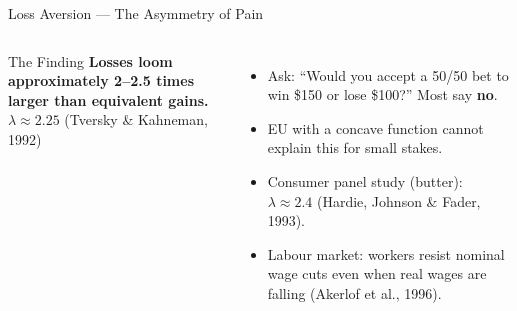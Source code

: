 \documentclass[aspectratio=169]{beamer}
\begin{document}
\begin{frame}{Loss Aversion --- The Asymmetry of Pain}
\begin{columns}
\begin{block}{The Finding}
\textbf{Losses loom approximately 2--2.5 times larger than equivalent gains.} \\[0.5em]
$\lambda \approx 2.25$ \quad (Tversky \& Kahneman, 1992)
\end{block}
\begin{itemize}[<+->]
  \item Ask: ``Would you accept a 50/50 bet to win \$150 or lose \$100?'' Most say \textbf{no}.
  \item EU with a concave function cannot explain this for small stakes.
  \item Consumer panel study (butter): $\lambda \approx 2.4$ (Hardie, Johnson \& Fader, 1993).
  \item Labour market: workers resist nominal wage cuts even when real wages are falling (Akerlof et al., 1996).
\end{itemize}
\end{columns}
\end{frame}
\end{document}
